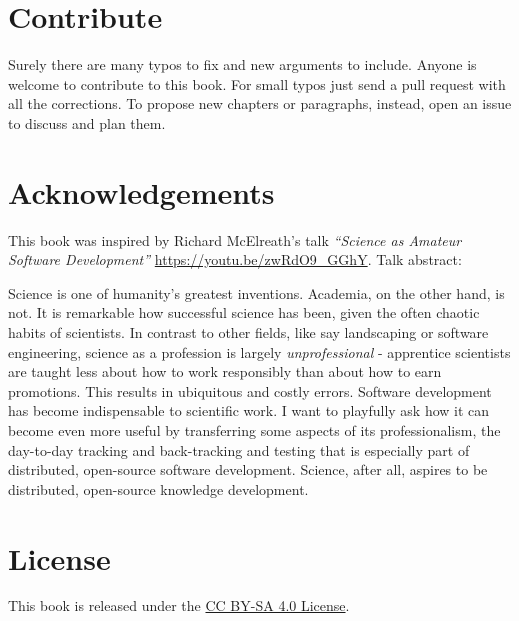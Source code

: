 \documentclass[
  11pt,
]{book}
\renewenvironment{quote}
               {\list{}{\rightmargin\leftmargin}%
                \item\relax\begin{line-left}\setlength{\parskip}{1em}}
               {\end{line-left}\endlist}
\begin{document}
\hypertarget{contribute}{%
\section*{Contribute}\label{contribute}}

Surely there are many typos to fix and new arguments to include. Anyone is welcome to contribute to this book. For small typos just send a pull request with all the corrections. To propose new chapters or paragraphs, instead, open an issue to discuss and plan them.

\hypertarget{acknowledgements}{%
\section*{Acknowledgements}\label{acknowledgements}}

This book was inspired by Richard McElreath's talk \emph{``Science as Amateur Software Development''} \url{https://youtu.be/zwRdO9_GGhY}. Talk abstract:

\begin{quote}
Science is one of humanity's greatest inventions. Academia, on the other hand, is not. It is remarkable how successful science has been, given the often chaotic habits of scientists. In contrast to other fields, like say landscaping or software engineering, science as a profession is largely \emph{unprofessional} - apprentice scientists are taught less about how to work responsibly than about how to earn promotions. This results in ubiquitous and costly errors. Software development has become indispensable to scientific work. I want to playfully ask how it can become even more useful by transferring some aspects of its professionalism, the day-to-day tracking and back-tracking and testing that is especially part of distributed, open-source software development. Science, after all, aspires to be distributed, open-source knowledge development.
\end{quote}

\hypertarget{license}{%
\section*{License}\label{license}}

This book is released under the \href{https://creativecommons.org/licenses/by-sa/4.0/}{CC BY-SA 4.0 License}.
\end{document}
